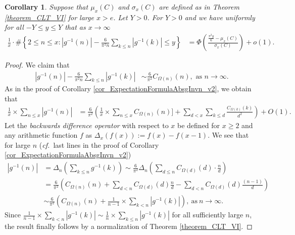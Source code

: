 \documentclass[11pt,reqno,a4letter]{article}
\numberwithin{figure}{section}
\numberwithin{table}{section}
\newcommand{\cf}{\textit{cf.\ }}
\theoremstyle{plain}
\newtheorem{cor}[theorem]{Corollary}
\numberwithin{theorem}{section}
\theoremstyle{definition}
\begin{document}
\begin{cor} 
\label{cor_CLT_VII} 
Suppose that $\mu_x(C)$ and $\sigma_x(C)$ are defined as in 
Theorem \ref{theorem_CLT_VI} for large $x > e$. 
Let $Y > 0$. 
For $Y > 0$ and we have uniformly for all $-Y \leq y \leq Y$ 
that as $x \rightarrow \infty$ 
\begin{align*} 
\frac{1}{x} \cdot \#\left\{2 \leq n \leq x:|g^{-1}(n)| - 
     \frac{6}{\pi^2 n} \sum_{k \leq n} |g^{-1}(k)| \leq y\right\} & = 
     \Phi\left(\frac{\frac{\pi^2 y}{6}-\mu_x(C)}{\sigma_x(C)}\right) + o(1). 
\end{align*} 
\end{cor} 
\begin{proof} 
We claim that 
\begin{align*} 
|g^{-1}(n)| - \frac{6}{\pi^2 n} \sum_{k \leq n} |g^{-1}(k)| & \sim \frac{6}{\pi^2} C_{\Omega(n)}(n), 
     \text{\ as\ } n \rightarrow \infty. 
\end{align*} 
As in the proof of Corollary \ref{cor_ExpectationFormulaAbsgInvn_v2}, 
we obtain that 
\begin{align*} 
\frac{1}{x} \times \sum_{n \leq x} |g^{-1}(n)| & = 
     \frac{6}{\pi^2} \left(\frac{1}{x} \times \sum_{n \leq x} C_{\Omega(n)}(n)] + \sum_{d<x} 
     \sum_{k \leq d} \frac{C_{\Omega(k)}(k)}{d^2}\right) + O(1). 
\end{align*} 
Let the \emph{backwards difference operator} with respect to $x$ 
be defined for $x \geq 2$ and any arithmetic function $f$ as 
$\Delta_x(f(x)) := f(x) - f(x-1)$. 
We see that for large $n$ 
(\cf last lines in the proof of Corollary \ref{cor_ExpectationFormulaAbsgInvn_v2}) 
\begin{align*} 
     |g^{-1}(n)| & = \Delta_n\left(\sum_{k \leq n} g^{-1}(k)\right)  
     \sim \frac{6}{\pi^2} \Delta_n\left(\sum_{d \leq n} C_{\Omega(d)}(d) \cdot \frac{n}{d}\right) \\ 
     & = \frac{6}{\pi^2}\left(C_{\Omega(n)}(n) + \sum_{d < n} C_{\Omega(d)}(d) \frac{n}{d} - 
     \sum_{d<n} C_{\Omega(d)}(d) \frac{(n-1)}{d}\right) \\ 
     & \sim \frac{6}{\pi^2} \left(C_{\Omega(n)}(n) + \frac{1}{n-1} \times \sum_{k < n} |g^{-1}(k)|\right), 
     \mathrm{\ as\ } n \rightarrow \infty. 
\end{align*} 
Since $\frac{1}{n-1} \times \sum_{k < n} |g^{-1}(k)| \sim \frac{1}{n} \times \sum_{k \leq n} |g^{-1}(k)|$ 
for all sufficiently large $n$, 
the result finally follows by a normalization of Theorem \ref{theorem_CLT_VI}. 
\end{proof} 
\end{document}
